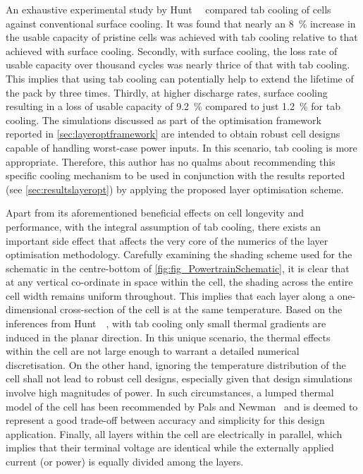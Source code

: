 An  exhaustive experimental  study  by  Hunt~\etal~\cite{Hunt2016} compared  tab
cooling of cells against conventional surface  cooling. It was found that nearly
an  \SI{8}{\percent} increase  in  the  usable capacity  of  pristine cells  was
achieved  with tab  cooling  relative  to that  achieved  with surface  cooling.
Secondly, with surface  cooling, the loss rate of usable  capacity over thousand
cycles was nearly thrice  of that with tab cooling. This  implies that using tab
cooling can potentially help to extend the  lifetime of the pack by three times.
Thirdly,  at higher  discharge rates,  surface cooling  resulting in  a loss  of
usable capacity  of \SI{9.2}{\percent}  compared to just  \SI{1.2}{\percent} for
tab cooling.  The simulations  discussed as part  of the  optimisation framework
reported  in \cref{sec:layeroptframework}  are  intended to  obtain robust  cell
designs  capable of  handling worst-case  power  inputs. In  this scenario,  tab
cooling  is  more  appropriate.  Therefore,  this author  has  no  qualms  about
recommending this specific cooling mechanism to  be used in conjunction with the
results reported (see \cref{sec:resultslayeropt}) by applying the proposed layer
optimisation scheme.

Apart  from  its  aforementioned  beneficial   effects  on  cell  longevity  and
performance,  with the  integral  assumption  of tab  cooling,  there exists  an
important side effect  that affects the very  core of the numerics  of the layer
optimisation methodology.  Carefully examining the  shading scheme used  for the
schematic  in the  centre-bottom  of  \cref{fig:fig_PowertrainSchematic}, it  is
clear that  at any vertical  co-ordinate in space  within the cell,  the shading
across the entire cell width remains  uniform throughout. This implies that each
layer  along  a  one-dimensional  cross-section  of the  cell  is  at  the  same
temperature. Based  on the inferences from  Hunt~\etal~\cite{Hunt2016}, with tab
cooling only  small thermal gradients  are induced  in the planar  direction. In
this unique scenario,  the thermal effects within the cell  are not large enough
to warrant a detailed numerical discretisation.  On the other hand, ignoring the
temperature distribution  of the  cell shall  not lead  to robust  cell designs,
especially given  that design simulations  involve high magnitudes of  power. In
such circumstances, a  lumped thermal model of the cell  has been recommended by
Pals  and Newman~\cite{Pals1995}  and is  deemed to  represent a  good trade-off
between accuracy and simplicity for this design application. Finally, all layers
within the cell are electrically in  parallel, which implies that their terminal
voltage are identical while the externally applied current (or power) is equally
divided among the layers.

